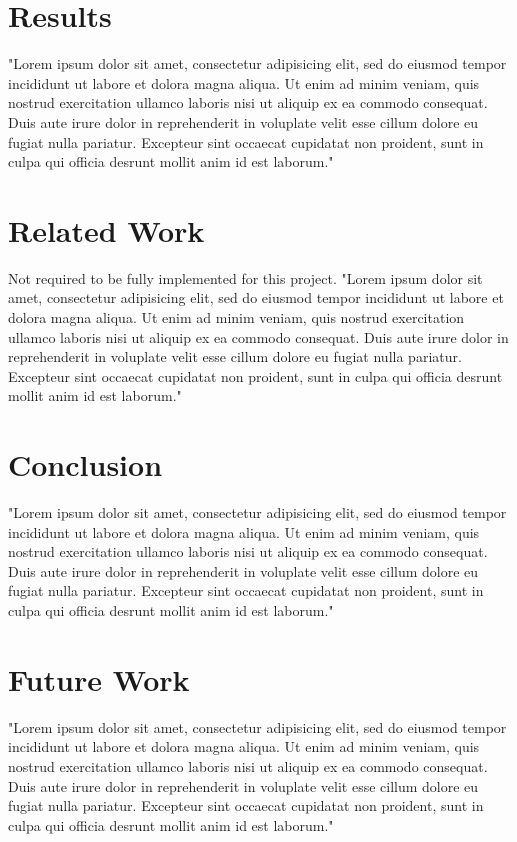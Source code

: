 \documentclass[11pt, twocolumn]{article}
\begin{document}
\section{Results} %
"Lorem ipsum dolor sit amet, consectetur adipisicing elit, sed do eiusmod tempor incididunt ut labore et dolora magna aliqua.  Ut enim ad minim veniam, quis nostrud exercitation ullamco laboris nisi ut aliquip ex ea commodo consequat.  Duis aute irure dolor in reprehenderit in voluplate velit esse cillum dolore eu fugiat nulla pariatur.  Excepteur sint occaecat cupidatat non proident, sunt in culpa qui officia desrunt mollit anim id est laborum."

\section{Related Work} %
Not required to be fully implemented for this project.
"Lorem ipsum dolor sit amet, consectetur adipisicing elit, sed do eiusmod tempor incididunt ut labore et dolora magna aliqua.  Ut enim ad minim veniam, quis nostrud exercitation ullamco laboris nisi ut aliquip ex ea commodo consequat.  Duis aute irure dolor in reprehenderit in voluplate velit esse cillum dolore eu fugiat nulla pariatur.  Excepteur sint occaecat cupidatat non proident, sunt in culpa qui officia desrunt mollit anim id est laborum."

\section{Conclusion} %
"Lorem ipsum dolor sit amet, consectetur adipisicing elit, sed do eiusmod tempor incididunt ut labore et dolora magna aliqua.  Ut enim ad minim veniam, quis nostrud exercitation ullamco laboris nisi ut aliquip ex ea commodo consequat.  Duis aute irure dolor in reprehenderit in voluplate velit esse cillum dolore eu fugiat nulla pariatur.  Excepteur sint occaecat cupidatat non proident, sunt in culpa qui officia desrunt mollit anim id est laborum."

\section{Future Work} %
"Lorem ipsum dolor sit amet, consectetur adipisicing elit, sed do eiusmod tempor incididunt ut labore et dolora magna aliqua.  Ut enim ad minim veniam, quis nostrud exercitation ullamco laboris nisi ut aliquip ex ea commodo consequat.  Duis aute irure dolor in reprehenderit in voluplate velit esse cillum dolore eu fugiat nulla pariatur.  Excepteur sint occaecat cupidatat non proident, sunt in culpa qui officia desrunt mollit anim id est laborum."
\end{document}
